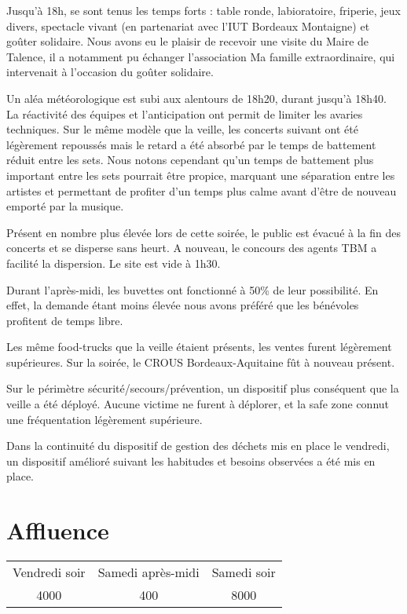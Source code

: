 \documentclass[12pt,a4paper]{report}
\begin{document}
Jusqu'à 18h, se sont tenus les temps forts : table ronde, labioratoire, friperie, jeux divers, spectacle vivant (en partenariat avec l'IUT Bordeaux Montaigne) et goûter solidaire. Nous avons eu le plaisir de recevoir une visite du Maire de Talence, il a notamment pu échanger l'association Ma famille extraordinaire, qui intervenait à l'occasion du goûter solidaire.

Un aléa météorologique est subi aux alentours de 18h20, durant jusqu'à 18h40. La réactivité des équipes et l'anticipation ont permit de limiter les avaries techniques. Sur le même modèle que la veille, les concerts suivant ont été légèrement repoussés mais le retard a été absorbé par le temps de battement réduit entre les sets. Nous notons cependant qu'un temps de battement plus important entre les sets pourrait être propice, marquant une séparation entre les artistes et permettant de profiter d'un temps plus calme avant d'être de nouveau emporté par la musique.

Présent en nombre plus élevée lors de cette soirée, le public est évacué à la fin des concerts et se disperse sans heurt. A nouveau, le concours des agents TBM a facilité la dispersion. Le site est vide à 1h30.

Durant l'après-midi, les buvettes ont fonctionné à 50\% de leur possibilité. En effet, la demande étant moins élevée nous avons préféré que les bénévoles profitent de temps libre. 

Les même food-trucks que la veille étaient présents, les ventes furent légèrement supérieures. 
Sur la soirée, le CROUS Bordeaux-Aquitaine fût à nouveau présent.

Sur le périmètre sécurité/secours/prévention, un dispositif plus conséquent que la veille a été déployé. Aucune victime ne furent à déplorer, et la safe zone connut une fréquentation légèrement supérieure. 

Dans la continuité du dispositif de gestion des déchets mis en place le vendredi, un dispositif amélioré suivant les habitudes et besoins observées a été mis en place.

\section{Affluence}

\begin{tabular}{|c|c|c|}
Vendredi soir & Samedi après-midi & Samedi soir \\
4000 & 400 & 8000\\
\end{tabular}
\end{document}
